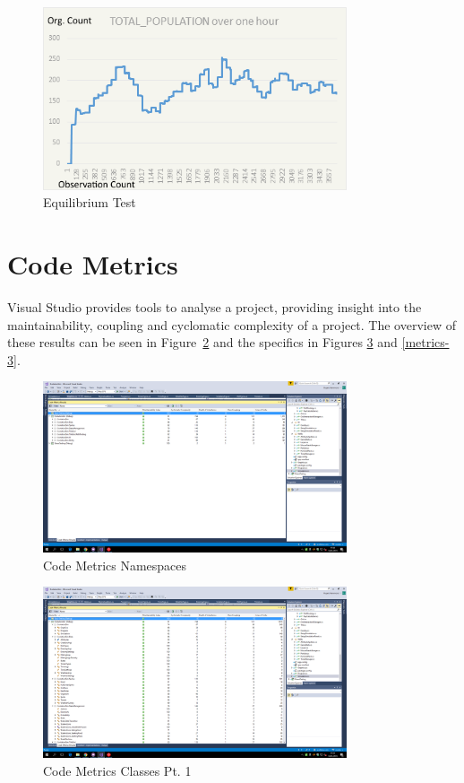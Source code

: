 \documentclass[a4paper, oneside, 11pt]{report}
\begin{document}
\begin{figure}[H]
	\caption{Equilibrium Test}\label{equilibrium-test}
	\centering
	\includegraphics[width=0.8\textwidth]{equilibrium-test}
\end{figure}
	

\section{Code Metrics}
Visual Studio provides tools to analyse a project, providing insight into the maintainability, coupling and cyclomatic complexity of a project. The overview of these results can be seen in Figure~\ref{metrics-1} and the specifics in Figures \ref{metrics-2} and \ref{metrics-3}.

\begin{figure}[H]
	\caption{Code Metrics Namespaces}\label{metrics-1}
	\centering
	\includegraphics[width=0.8\textwidth]{metrics-1}
\end{figure}

\begin{figure}[H]
\caption{Code Metrics Classes Pt. 1}\label{metrics-2}
\centering
\includegraphics[width=0.8\textwidth]{metrics-2}
\end{figure}
\end{document}
